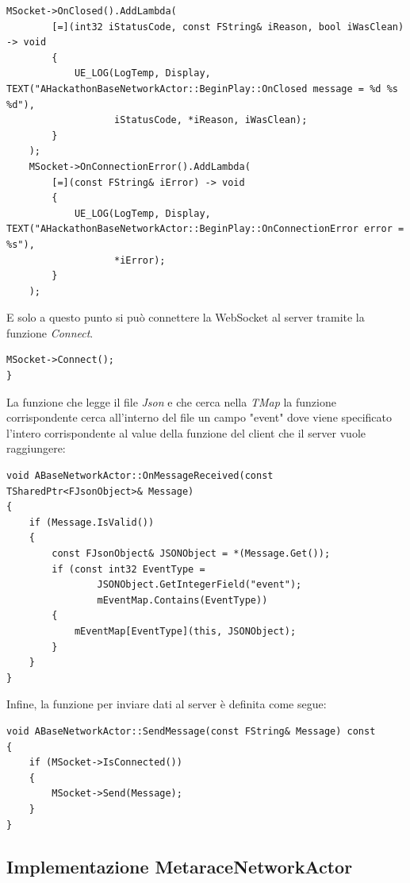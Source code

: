 \begin{lstlisting}[firstnumber=24, caption=Lambda function per la gestione della chiusura della connessione e dell'errore durante la connessione]
	MSocket->OnClosed().AddLambda(
		[=](int32 iStatusCode, const FString& iReason, bool iWasClean) -> void
		{
			UE_LOG(LogTemp, Display, TEXT("AHackathonBaseNetworkActor::BeginPlay::OnClosed message = %d %s %d"),
			       iStatusCode, *iReason, iWasClean);
		}
	);
	MSocket->OnConnectionError().AddLambda(
		[=](const FString& iError) -> void
		{
			UE_LOG(LogTemp, Display, TEXT("AHackathonBaseNetworkActor::BeginPlay::OnConnectionError error = %s"),
			       *iError);
		}
	);
\end{lstlisting}

E solo a questo punto si può connettere la WebSocket al server tramite la funzione \textit{Connect}. 
\begin{lstlisting}[firstnumber=38, caption = Connessione della WebSocket]
	MSocket->Connect();
}
\end{lstlisting}

La funzione che legge il file \textit{Json} e che cerca nella \textit{TMap} la funzione corrispondente cerca all'interno del file un campo "event" dove viene specificato l'intero corrispondente al value della funzione del client che il server vuole raggiungere:

\begin{lstlisting}[caption = funzione che gestisce la ricezione del messaggio in ABaseNetworkActor]
void ABaseNetworkActor::OnMessageReceived(const TSharedPtr<FJsonObject>& Message)
{
    if (Message.IsValid())
    {
        const FJsonObject& JSONObject = *(Message.Get());
        if (const int32 EventType = 
                JSONObject.GetIntegerField("event"); 
                mEventMap.Contains(EventType))
        {
            mEventMap[EventType](this, JSONObject);
        }
    }
}    
\end{lstlisting}

Infine, la funzione per inviare dati al server è definita come segue:

\begin{lstlisting}[caption = Funzione per inviare dati al server attraverso la WebSocket]
void ABaseNetworkActor::SendMessage(const FString& Message) const
{
    if (MSocket->IsConnected())
    {
        MSocket->Send(Message);
    }
}
\end{lstlisting}

    \subsection{Implementazione MetaraceNetworkActor}

